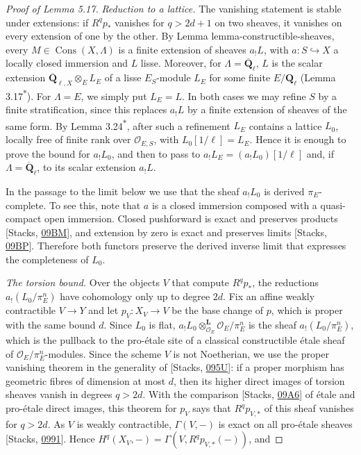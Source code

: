 \documentclass[11pt]{article}
\newcommand{\bpout}[1]{#1\textsuperscript{\hyperlink{bp-outside}{\ensuremath{\ast}}}}
\providecommand{\Cons}{}\renewcommand{\Cons}{\operatorname{Cons}}
\providecommand{\QbarX}{}\renewcommand{\QbarX}{\overline{\mathbf Q}_{\ell,X}}
\begin{document}
\begin{proof}[{Proof of Lemma 5.17}]\label{bp59}%
\emph{Reduction to a lattice.} The vanishing statement is stable under extensions: if \(R^qp_*\) vanishes for \(q>2d+1\) on two sheaves, it vanishes on every extension of one by the other. By Lemma lemma-constructible-sheaves, every \(M\in\Cons(X,\Lambda)\) is a finite extension of sheaves \(a_!L\), with \(a:S\hookrightarrow X\) a locally closed immersion and \(L\) lisse. Moreover, for \(\Lambda=\overline{\mathbf Q}_\ell\), \(L\) is the scalar extension \(\QbarX\otimes_{E}L_E\) of a lisse \(E_S\)-module \(L_E\) for some finite \(E/\mathbf Q_\ell\) (Lemma \bpout{3.17}). For \(\Lambda=E\), we simply put \(L_E=L\). In both cases we may refine \(S\) by a finite stratification, since this replaces \(a_!L\) by a finite extension of sheaves of the same form. By Lemma \bpout{3.24}, after such a refinement \(L_E\) contains a lattice \(L_0\), locally free of finite rank over \(\mathcal O_{E,S}\), with \(L_0[1/\ell]=L_E\). Hence it is enough to prove the bound for \(a_!L_0\), and then to pass to \(a_!L_E=(a_!L_0)[1/\ell]\) and, if \(\Lambda=\overline{\mathbf Q}_\ell\), to its scalar extension \(a_!L\).

In the passage to the limit below we use that the sheaf \(a_!L_0\) is derived \(\pi_E\)-complete. To see this, note that \(a\) is a closed immersion composed with a quasi-compact open immersion. Closed pushforward is exact and preserves products [Stacks, \href{https://stacks.math.columbia.edu/tag/09BM}{09BM}], and extension by zero is exact and preserves limits [Stacks, \href{https://stacks.math.columbia.edu/tag/09BP}{09BP}]. Therefore both functors preserve the derived inverse limit that expresses the completeness of \(L_0\).

\emph{The torsion bound.} Over the objects \(V\) that compute \(R^qp_*\), the reductions \(a_!(L_0/\pi_E^n)\) have cohomology only up to degree \(2d\). Fix an affine weakly contractible \(V\to Y\) and let \(p_V:X_V\to V\) be the base change of \(p\), which is proper with the same bound \(d\). Since \(L_0\) is flat, \(a_!L_0\otimes^{\mathbf L}_{\mathcal O_E}
\mathcal O_E/\pi_E^n\) is the sheaf \(a_!(L_0/\pi_E^n)\), which is the pullback to the pro-étale site of a classical constructible étale sheaf of \(\mathcal O_E/\pi_E^n\)-modules. Since the scheme \(V\) is not Noetherian, we use the proper vanishing theorem in the generality of [Stacks, \href{https://stacks.math.columbia.edu/tag/095U}{095U}]: if a proper morphism has geometric fibres of dimension at most \(d\), then its higher direct images of torsion sheaves vanish in degrees \(q>2d\). With the comparison [Stacks, \href{https://stacks.math.columbia.edu/tag/09A6}{09A6}] of étale and pro-étale direct images, this theorem for \(p_V\) says that \(R^qp_{V,*}\) of this sheaf vanishes for \(q>2d\). As \(V\) is weakly contractible, \(\Gamma(V,-)\) is exact on all pro-étale sheaves [Stacks, \href{https://stacks.math.columbia.edu/tag/0991}{0991}]. Hence \(H^q(X_V,-)=\Gamma(V,R^qp_{V,*}(-))\), and


\end{proof}
\end{document}
